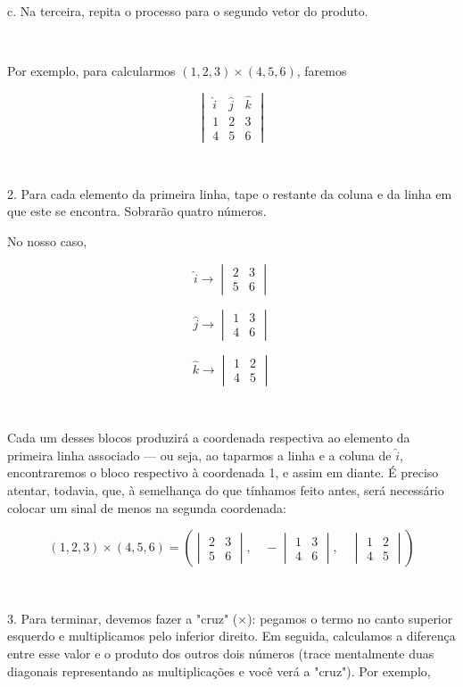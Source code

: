 c. Na terceira, repita o processo para o segundo vetor do produto.

 

Por exemplo, para calcularmos \((1, 2, 3) \times (4, 5, 6)\), faremos

\[
\begin{vmatrix} \hat{i} & \hat{j} & \hat{k} \\ 1 & 2 & 3 \\ 4 & 5 & 6 \end{vmatrix}
\]

 

2. Para cada elemento da primeira linha, tape o restante da coluna e da linha em que este se encontra. Sobrarão quatro números.

No nosso caso,

\[
\hat{i} \to \begin{vmatrix} 2 & 3 \\ 5 & 6 \end{vmatrix}
\]


\[
\hat{j} \to \begin{vmatrix} 1 & 3 \\ 4 & 6 \end{vmatrix}
\]


\[
\hat{k} \to \begin{vmatrix} 1 & 2 \\ 4 & 5 \end{vmatrix}
\]

 

Cada um desses blocos produzirá a coordenada respectiva ao elemento da primeira linha associado — ou seja, ao taparmos a linha e a coluna de \(\hat{i}\), encontraremos o bloco respectivo à coordenada 1, e assim em diante. É preciso atentar, todavia, que, à semelhança do que tínhamos feito antes, será necessário colocar um sinal de menos na segunda coordenada:

\[ (1, 2, 3) \times (4, 5, 6) =
\left(
\begin{vmatrix} 2 & 3 \\ 5 & 6 \end{vmatrix},\quad
-\begin{vmatrix} 1 & 3 \\ 4 & 6 \end{vmatrix},\quad
\begin{vmatrix} 1 & 2 \\ 4 & 5 \end{vmatrix}
\right)
\]

 

3. Para terminar, devemos fazer a "cruz" (\(\times\)): pegamos o termo no canto superior esquerdo e multiplicamos pelo inferior direito. Em seguida, calculamos a diferença entre esse valor e o produto dos outros dois números (trace mentalmente duas diagonais representando as multiplicações e você verá a "cruz"). Por exemplo,

